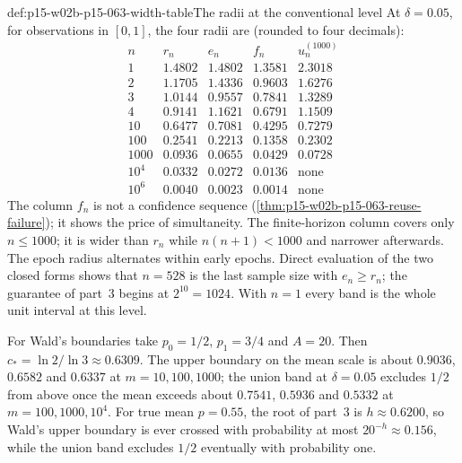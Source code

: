 \begin{hbexample}{def:p15-w02b-p15-063-width-table}{The radii at the conventional level}
At \(\delta=0.05\), for observations in \([0,1]\), the four radii are
(rounded to four decimals):
\[
\begin{array}{r|cccc}
 n & r_n & e_n & f_n & u^{(1000)}_n\\ \hline
 1 & 1.4802 & 1.4802 & 1.3581 & 2.3018\\
 2 & 1.1705 & 1.4336 & 0.9603 & 1.6276\\
 3 & 1.0144 & 0.9557 & 0.7841 & 1.3289\\
 4 & 0.9141 & 1.1621 & 0.6791 & 1.1509\\
 10 & 0.6477 & 0.7081 & 0.4295 & 0.7279\\
 100 & 0.2541 & 0.2213 & 0.1358 & 0.2302\\
 1000 & 0.0936 & 0.0655 & 0.0429 & 0.0728\\
 10^4 & 0.0332 & 0.0272 & 0.0136 & \text{none}\\
 10^6 & 0.0040 & 0.0023 & 0.0014 & \text{none}
\end{array}
\]
The column \(f_n\) is not a confidence sequence
(\cref{thm:p15-w02b-p15-063-reuse-failure}); it shows the price of
simultaneity. The finite-horizon column covers only \(n\leq1000\); it is
wider than \(r_n\) while \(n(n+1)<1000\) and narrower afterwards. The
epoch radius alternates within early epochs. Direct evaluation of the two
closed forms shows that \(n=528\) is the last sample size with
\(e_n\geq r_n\); the guarantee of part~3 begins at \(2^{10}=1024\). With
\(n=1\) every band is the whole unit interval at this level.

For Wald's boundaries take \(p_0=1/2\), \(p_1=3/4\) and \(A=20\). Then
\(c_*=\ln2/\ln3\approx0.6309\). The upper boundary on the mean scale is
about \(0.9036\), \(0.6582\) and \(0.6337\) at \(m=10,100,1000\); the
union band at \(\delta=0.05\) excludes \(1/2\) from above once the mean
exceeds about \(0.7541\), \(0.5936\) and \(0.5332\) at
\(m=100,1000,10^4\). For true mean \(p=0.55\), the root of part~3 is
\(h\approx0.6200\), so Wald's upper boundary is ever crossed with
probability at most \(20^{-h}\approx0.156\), while the union band excludes
\(1/2\) eventually with probability one.
\end{hbexample}

